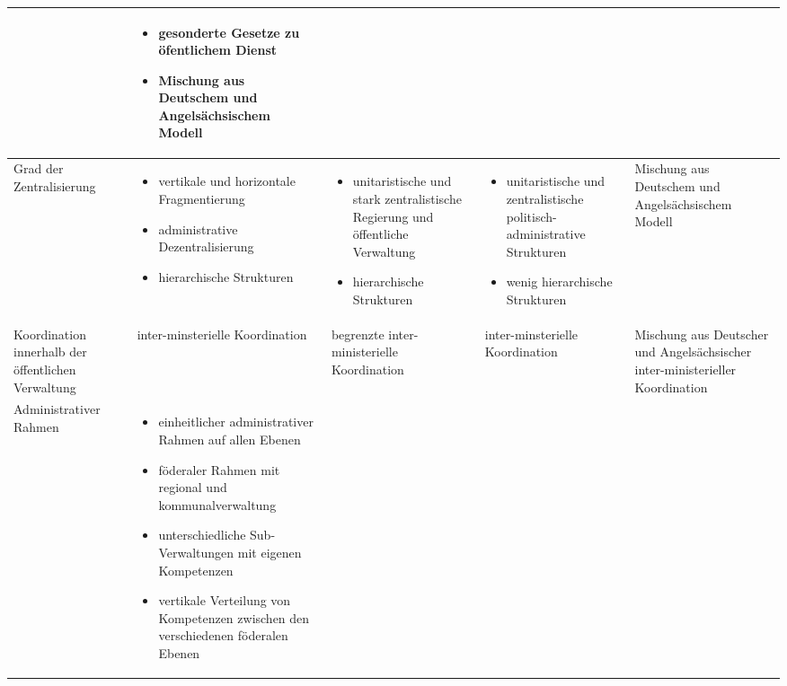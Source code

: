 \begin{landscape}
\begin{table}[!hbt]
\begin{tabular}{|p{4cm}|p{5cm}|p{5cm}|p{5cm}|p{4cm}|}
&
\begin{itemize}[leftmargin=*]
\item gesonderte Gesetze zu öfentlichem Dienst            
\item Mischung aus Deutschem und Angelsächsischem Modell
\end{itemize}\\\hline
Grad der Zentralisierung&
\begin{itemize}[leftmargin=*]
\item vertikale und horizontale Fragmentierung
\item administrative Dezentralisierung
\item hierarchische Strukturen
\end{itemize}
&
\begin{itemize}[leftmargin=*]
\item unitaristische und stark zentralistische Regierung und öffentliche Verwaltung
\item hierarchische Strukturen
\end{itemize}
 &
\begin{itemize}[leftmargin=*]
\item unitaristische und zentralistische politisch-administrative Strukturen
\item wenig hierarchische Strukturen 	
\end{itemize}
&
Mischung aus Deutschem und Angelsächsischem Modell\\\hline
Koordination innerhalb der öffentlichen Verwaltung	&inter-minsterielle Koordination	&begrenzte inter-ministerielle Koordination&	inter-minsterielle Koordination&	Mischung aus Deutscher und Angelsächsischer inter-ministerieller Koordination\\\hline
Administrativer Rahmen	&
 \vspace{-3mm}
\begin{itemize}[leftmargin=*]
\item einheitlicher administrativer Rahmen auf allen Ebenen
\item föderaler Rahmen mit regional und kommunalverwaltung
\item unterschiedliche Sub-Verwaltungen mit eigenen Kompetenzen
\item vertikale Verteilung von Kompetenzen zwischen den verschiedenen föderalen Ebenen
 \vspace{-3mm}\end{itemize}


\end{tabular}
\end{table}
\end{landscape}
